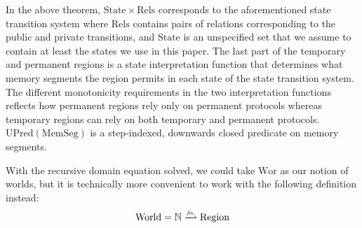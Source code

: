 \documentclass{llncs}
\newcommand{\finparfun}{\xrightharpoonup{\textit{\tiny{fin}}}}
\newcommand{\plaindom}[1]{\mathrm{#1}}
\newcommand{\HeapSegments}{\plaindom{MemSeg}}
\newcommand{\nats}{\mathbb{N}}
\newcommand{\Rels}{\plaindom{Rels}}
\newcommand{\States}{\plaindom{State}}
\newcommand{\Regions}{\plaindom{Region}}
\newcommand{\Worlds}{\plaindom{World}}
\newcommand{\Wor}{\plaindom{Wor}}
\newcommand{\UPred}[1]{\plaindom{UPred}(#1)}
\begin{document}
In the above theorem, $\States \times \Rels$ corresponds to the aforementioned
state transition system where $\Rels$ contains pairs of relations corresponding
to the public and private transitions, and $\States$ is an unspecified set that
we assume to contain at least the states we use in this paper. The last part of
the temporary and permanent regions is a state interpretation function that
determines what memory segments the region permits in each state of the state
transition system.  The different monotonicity requirements in the two
interpretation functions reflects how permanent regions rely only on permanent
protocols whereas temporary regions can rely on both temporary and permanent
protocols.  $\UPred{\HeapSegments}$ is a step-indexed, downwards closed
predicate on memory segments.

With the recursive domain equation solved, we could take $\Wor$ as our notion of
worlds, but it is technically more convenient to work with the following
definition instead:
\[
  \Worlds = \nats \finparfun \Regions
\]
\end{document}
